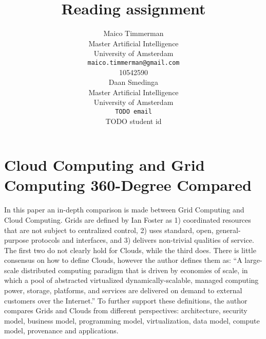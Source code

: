 \documentclass{article}
\title{Reading assignment}
\author{
  Maico Timmerman \\
  Master Artificial Intelligence\\
  University of Amsterdam\\
  \texttt{maico.timmerman@gmail.com} \\
  10542590 \\
  \And
  Daan Smedinga\\
  Master Artificial Intelligence\\
  University of Amsterdam\\
  \texttt{TODO email}\\
  TODO student id
}
\begin{document}

\maketitle


\section*{Cloud Computing and Grid Computing 360-Degree Compared}

In this paper an in-depth comparison is made between Grid Computing and Cloud
Computing. Grids are defined by Ian Foster as 1) coordinated resources that are
not subject to centralized control, 2) uses standard, open, general-purpose
protocols and interfaces, and 3) delivers non-trivial qualities of service. The
first two do not clearly hold for Clouds, while the third does. There is little
consensus on how to define Clouds, however the author defines them as: ``A
large-scale distributed computing paradigm that is driven by economies of scale,
in which a pool of abstracted virtualized dynamically-scalable, managed
computing power, storage, platforms, and services are delivered on demand to
external customers over the Internet.''
To further support these definitions, the author compares Grids and Clouds from
different perspectives: architecture, security model, business model,
programming model, virtualization, data model, compute model, provenance and
applications.
\end{document}
